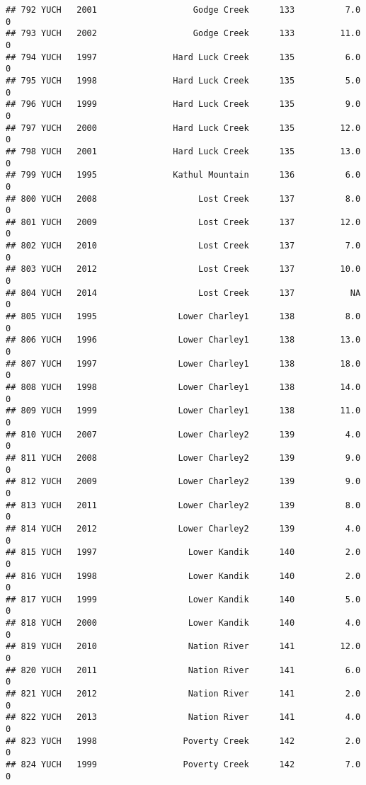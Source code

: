 \documentclass[
]{article}
\begin{document}
\begin{verbatim}
## 792 YUCH   2001                   Godge Creek      133          7.0       0
## 793 YUCH   2002                   Godge Creek      133         11.0       0
## 794 YUCH   1997               Hard Luck Creek      135          6.0       0
## 795 YUCH   1998               Hard Luck Creek      135          5.0       0
## 796 YUCH   1999               Hard Luck Creek      135          9.0       0
## 797 YUCH   2000               Hard Luck Creek      135         12.0       0
## 798 YUCH   2001               Hard Luck Creek      135         13.0       0
## 799 YUCH   1995               Kathul Mountain      136          6.0       0
## 800 YUCH   2008                    Lost Creek      137          8.0       0
## 801 YUCH   2009                    Lost Creek      137         12.0       0
## 802 YUCH   2010                    Lost Creek      137          7.0       0
## 803 YUCH   2012                    Lost Creek      137         10.0       0
## 804 YUCH   2014                    Lost Creek      137           NA       0
## 805 YUCH   1995                Lower Charley1      138          8.0       0
## 806 YUCH   1996                Lower Charley1      138         13.0       0
## 807 YUCH   1997                Lower Charley1      138         18.0       0
## 808 YUCH   1998                Lower Charley1      138         14.0       0
## 809 YUCH   1999                Lower Charley1      138         11.0       0
## 810 YUCH   2007                Lower Charley2      139          4.0       0
## 811 YUCH   2008                Lower Charley2      139          9.0       0
## 812 YUCH   2009                Lower Charley2      139          9.0       0
## 813 YUCH   2011                Lower Charley2      139          8.0       0
## 814 YUCH   2012                Lower Charley2      139          4.0       0
## 815 YUCH   1997                  Lower Kandik      140          2.0       0
## 816 YUCH   1998                  Lower Kandik      140          2.0       0
## 817 YUCH   1999                  Lower Kandik      140          5.0       0
## 818 YUCH   2000                  Lower Kandik      140          4.0       0
## 819 YUCH   2010                  Nation River      141         12.0       0
## 820 YUCH   2011                  Nation River      141          6.0       0
## 821 YUCH   2012                  Nation River      141          2.0       0
## 822 YUCH   2013                  Nation River      141          4.0       0
## 823 YUCH   1998                 Poverty Creek      142          2.0       0
## 824 YUCH   1999                 Poverty Creek      142          7.0       0

\end{verbatim}
\end{document}
